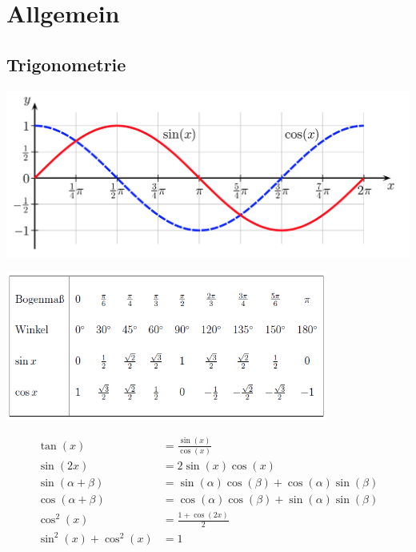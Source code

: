 \documentclass[11pt]{article}
\begin{document}
\section{Allgemein}

\subsection{Trigonometrie}

\begin{center}
	\includegraphics[width=\linewidth,keepaspectratio=true]{images/trigonometry}
\end{center}

\begin{center}
	\includegraphics[width=300pt]{images/trigonometry_table}
\end{center}

\begin{equation*}
\begin{split}
	\tan(x) & = \frac{\sin(x)}{\cos(x)} \\
	\sin(2x) & = 2\sin(x)\cos(x) \\
	\sin(\alpha + \beta) & = \sin(\alpha)\cos(\beta) + \cos(\alpha)\sin(\beta) \\
	\cos(\alpha + \beta) & = \cos(\alpha)\cos(\beta) + \sin(\alpha)\sin(\beta) \\
	\cos^2(x) & = \frac{1 + \cos(2x)}{2} \\
	\sin^2(x) + \cos^2(x) & = 1
\end{split}
\end{equation*}
\end{document}
